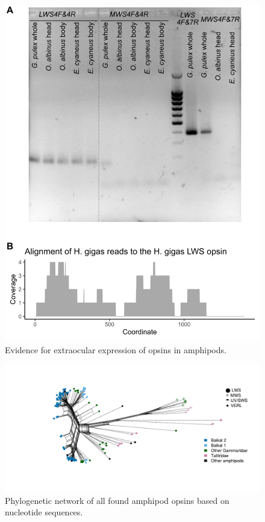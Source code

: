 \documentclass{article}
\begin{document}
\begin{figure}[H] 
	\includegraphics[scale=0.65]{./FigS4_cDNA_diff_body_parts.png}
	\caption{Evidence for extraocular expression of opsins in amphipods.} \end{figure}

\begin{figure}[H] 
	\includegraphics[width=\linewidth]{./FigS5_all_opsins_network.pdf}
	\caption{Phylogenetic network of all found amphipod opsins based on nucleotide sequences.} \end{figure}
\end{document}
